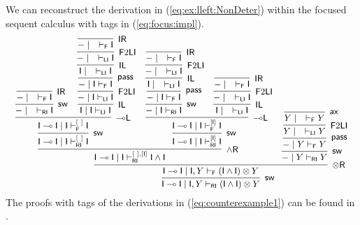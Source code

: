 \documentclass[submission,copyright,creativecommons]{eptcs}
\theoremstyle{definition}
\newcommand{\tr}{\otimes \mathsf{R}}
\newcommand{\lleft}{{\multimap}\mathsf{L}}
\newcommand{\pass}{\mathsf{pass}}
\newcommand{\unitl}{\mathsf{IL}}
\newcommand{\unitr}{\mathsf{IR}}
\newcommand{\andr}{\land \mathsf{R}}
\newcommand{\ax}{\mathsf{ax}}
\newcommand{\ot}{\otimes}
\newcommand{\lolli}{\multimap}
\newcommand{\I}{\mathsf{I}}
\newcommand{\RI}{\mathsf{RI}}
\newcommand{\LI}{\mathsf{LI}}
\newcommand{\F}{\mathsf{F}}
\newcommand{\sw}{\mathsf{sw}}
\newcommand{\proofbox}[1]{\begin{tabular}{l} #1 \end{tabular}}
\begin{document}
We can reconstruct the derivation in (\ref{eq:ex:lleft:NonDeter}) within the focused sequent calculus with tags in (\ref{eq:focus:impl}).
\begin{displaymath}\small
  \infer[\sw]{\I \lolli \I \mid \I , Y \vdash_{\RI} (\I \land \I) \ot Y}{
    \infer[\tr]{\I \lolli \I \mid \I , Y \vdash_{\F} (\I \land \I) \ot Y}{
      \infer[\andr]{\I \lolli \I \mid \I \vdash^{{[\ ]} , {[\I]}}_{\RI} \I \land \I}{
        \infer[\sw]{\I \lolli \I \mid \I \vdash^{{[\ ]}}_{\RI} \I}{
          \infer[\lleft]{\I \lolli \I \mid \I \vdash^{{[\ ]}}_{\F} \I}{
            \infer[\sw]{- \mid \quad \vdash_{\RI} \I}{
              \infer[\unitr]{- \mid \quad \vdash_{\F} \I}{}
            }
            &
            \infer[\unitl]{\I \mid \I \vdash_{\LI} \I}{
              \infer[\F 2 \LI]{- \mid \I \vdash_{\LI} \I}{
                \infer[\pass]{- \mid \I \vdash_{\F} \I}{
                  \infer[\unitl]{\I \mid \quad \vdash_{\LI} \I}{
                    \infer[\F 2 \LI]{- \mid \quad \vdash_{\LI} \I}{
                      \infer[\unitr]{- \mid \quad \vdash_{\F} \I}{}
                    }
                  }
                }
              }
            }
          }
        }
        &
        \infer[\sw]{\I \lolli \I \mid \I \vdash^{{[\I]}}_{\RI} \I}{
          \infer[\lleft]{\I \lolli \I \mid \I \vdash^{{[\I]}}_{\F} \I}{
            \infer[\sw]{- \mid \I \vdash_{\RI} \I}{
              \infer[\pass]{- \mid \I \vdash_{\F} \I}{
                \infer[\unitl]{\I \mid \quad \vdash_{\LI} \I}{
                  \infer[\F 2 \LI]{- \mid \quad \vdash_{\LI} \I}{
                    \infer[\unitr]{- \mid \quad \vdash_{\F} \I}{}
                  }
                }
              }
            }
            &
            \infer[\unitl]{\I \mid \quad \vdash_{\LI} \I}{
              \infer[\F 2 \LI]{- \mid \quad \vdash_{\LI} \I}{
                \infer[\unitr]{- \mid \quad \vdash_{\F} \I}{}
              }
            }
          }
        }
      }
      &
      \infer[\sw]{- \mid Y \vdash_{\RI} Y}{
        \infer[\pass]{- \mid Y \vdash_{\F} Y}{
          \infer[\F 2 \LI]{Y \mid \quad \vdash_{\LI} Y}{
            \infer[\ax]{Y \mid \quad \vdash_{\F} Y}{}
          }
        }
      }
    }
  }
\end{displaymath}
The proofs with tags of the derivations in (\ref{eq:counterexample1}) can be found in \cite{UVW:protsn}.
\end{document}
